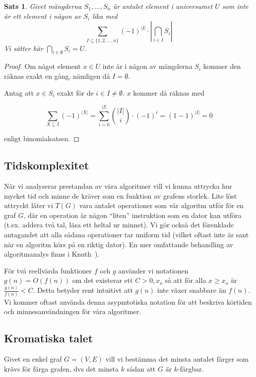 \documentclass[a4paper]{report}
\newtheorem{theorem}{Sats}
\begin{document}
\begin{theorem}
    Givet mängderna $S_1, ..., S_n$ är antalet element i universumet $U$ som inte är ett element i någon av $S_i$ lika med
    $$\sum_{I \subseteq \{1, 2, ..., n\}}{(-1)^{|I|} \cdot |\bigcap_{i\in I}{S_i}|}$$
    Vi sätter här $\bigcap_{i \in \emptyset}{S_i} = U$.
\end{theorem}
\begin{proof}
    Om något element $x \in U$ inte är i någon av mängderna $S_i$ kommer den räknas exakt en gång, nämligen då $I = \emptyset$.

    Antag att $x \in S_i$ exakt för de $i \in I \not= \emptyset$. $x$ kommer då räknas med 

    $$\sum_{X \subseteq I}{(-1)^{|X|}} = \sum_{i=0}^{|I|}{{|I| \choose i}\cdot(-1)^i} = (1-1)^{|I|} = 0$$

    enligt binomialsatsen.
\end{proof}


\subsection{Tidskomplexitet}

När vi analyserar prestandan av våra algoritmer vill vi kunna uttrycka hur mycket tid och minne de kräver som en funktion av grafens storlek. Lite löst uttryckt
låter vi $T(G)$ vara antalet operationer som vår algoritm utför för en graf $G$, där en operation är någon ``liten'' instruktion som en dator kan utföra (t.ex.
addera två tal, läsa ett heltal ur minnet). Vi gör också det förenklade antagandet att alla sådana operationer tar uniform tid (vilket oftast inte är sant när en algoritm
körs på en riktig dator). En mer omfattande behandling av algoritmanalys finns i Knuth~\cite{Knuth1:1997}).

För två reellvärda funktioner $f$ och $g$ använder vi notationen $g(n) = O(f(n))$ om det existerar ett $C > 0, x_o$ så att för alla $x \ge x_o$ är $\frac{g(n)}{f(n)} < C$. Detta betyder rent intuitivt att $g(n)$
inte växer snabbare än $f(n)$. Vi kommer oftast använda denna asypmtotiska notation för att beskriva körtiden och minnesanvändningen för våra algoritmer.

\subsection{Kromatiska talet}

Givet en enkel graf $G = (V, E)$ vill vi bestämma det minsta antalet färger som krävs för färga grafen, dvs det minsta $k$ sådan att $G$ är $k$-färgbar.
\end{document}
